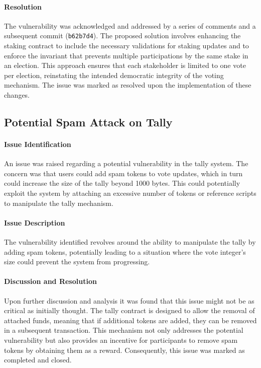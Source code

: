 \documentclass[11pt]{article}
\begin{document}
\paragraph{Resolution}
The vulnerability was acknowledged and addressed by a series of comments and a subsequent commit (\texttt{b62b7d4}).
The proposed solution involves enhancing the staking contract to include the necessary validations for staking updates and to enforce the invariant that prevents multiple participations by the same stake in an election.
This approach ensures that each stakeholder is limited to one vote per election, reinstating the intended democratic integrity of the voting mechanism.
The issue was marked as resolved upon the implementation of these changes.

\subsection{Potential Spam Attack on Tally}

\paragraph{Issue Identification}
An issue was raised regarding a potential vulnerability in the tally system.
The concern was that users could add spam tokens to vote updates, which in turn could increase the size of the tally beyond 1000 bytes.
This could potentially exploit the system by attaching an excessive number of tokens or reference scripts to manipulate the tally mechanism.

\paragraph{Issue Description}
The vulnerability identified revolves around the ability to manipulate the tally by adding spam tokens, potentially leading to a situation where the vote integer's size could prevent the system from progressing.

\paragraph{Discussion and Resolution}
Upon further discussion and analysis it was found that this issue might not be as critical as initially thought.
The tally contract is designed to allow the removal of attached funds, meaning that if additional tokens are added, they can be removed in a subsequent transaction.
This mechanism not only addresses the potential vulnerability but also provides an incentive for participants to remove spam tokens by obtaining them as a reward.
Consequently, this issue was marked as completed and closed.
\end{document}
